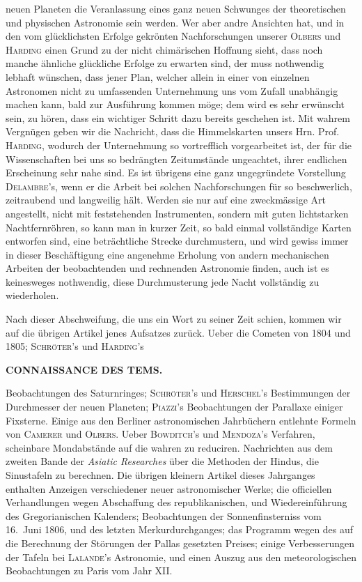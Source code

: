 neuen Planeten die Veranlassung eines ganz neuen Schwunges der theoretischen und physischen Astronomie sein werden. Wer aber andre Ansichten hat, und in den vom glücklichsten Erfolge gekrönten Nachforschungen unserer \textsc{Olbers} und \textsc{Harding} einen Grund zu der nicht chimärischen Hoffnung sieht, dass noch manche ähnliche glückliche Erfolge zu erwarten sind, der muss nothwendig lebhaft wünschen, dass jener Plan, welcher allein in einer von einzelnen Astronomen nicht zu umfassenden Unternehmung uns vom Zufall unabhängig machen kann, bald zur Ausführung kommen möge; dem wird es sehr erwünscht sein, zu hören, dass ein wichtiger Schritt dazu bereits geschehen ist. Mit wahrem Vergnügen geben wir die Nachricht, dass die Himmelskarten unsers Hrn. Prof. \textsc{Harding}, wodurch der Unternehmung so vortrefflich vorgearbeitet ist, der für die Wissenschaften bei uns so bedrängten Zeitumstände ungeachtet, ihrer endlichen Erscheinung sehr nahe sind. Es ist übrigens eine ganz ungegründete Vorstellung \textsc{Delambre}'s, wenn er die Arbeit bei solchen Nachforschungen für so beschwerlich, zeitraubend und langweilig hält. Werden sie nur auf eine zweckmässige Art angestellt, nicht mit feststehenden Instrumenten, sondern mit guten lichtstarken Nachtfernröhren, so kann man in kurzer Zeit, so bald einmal vollständige Karten entworfen sind, eine beträchtliche Strecke durchmustern, und wird gewiss immer in dieser Beschäftigung eine angenehme Erholung von andern mechanischen Arbeiten der beobachtenden und rechnenden Astronomie finden, auch ist es keinesweges nothwendig, diese Durchmusterung jede Nacht vollständig zu wiederholen.

Nach dieser Abschweifung, die uns ein Wort zu seiner Zeit schien, kommen wir auf die übrigen Artikel jenes Aufsatzes zurück. Ueber die Cometen von 1804 und 1805; \textsc{Schröter}'s und \textsc{Harding}'s\par
\clearpage
\noindent{}%
\makebox[12mm][l]{}%
\parbox[t]{\dimexpr\linewidth-24mm\relax}{\centering\footnotesize\bfseries CONNAISSANCE DES TEMS.\par}%
\par\nobreak\medskip
\noindent Beobachtungen des Saturnringes; \textsc{Schröter}'s und \textsc{Herschel}'s Bestimmungen der Durchmesser der neuen Planeten; \textsc{Piazzi}'s Beobachtungen der Parallaxe einiger Fixsterne. Einige aus den Berliner astronomischen Jahrbüchern entlehnte Formeln von \textsc{Camerer} und \textsc{Olbers}. Ueber \textsc{Bowditch}'s und \textsc{Mendoza}'s Verfahren, scheinbare Mondabstände auf die wahren zu reduciren. Nachrichten aus dem zweiten Bande der \emph{Asiatic Researches} über die Methoden der Hindus, die Sinustafeln zu berechnen. Die übrigen kleinern Artikel dieses Jahrganges enthalten Anzeigen verschiedener neuer astronomischer Werke; die officiellen Verhandlungen wegen Abschaffung des republikanischen, und Wiedereinführung des Gregorianischen Kalenders; Beobachtungen der Sonnenfinsterniss vom 16.\ Juni 1806, und des letzten Merkurdurchganges; das Programm wegen des auf die Berechnung der Störungen der Pallas gesetzten Preises; einige Verbesserungen der Tafeln bei \textsc{Lalande}'s Astronomie, und einen Auszug aus den meteorologischen Beobachtungen zu Paris vom Jahr XII.

